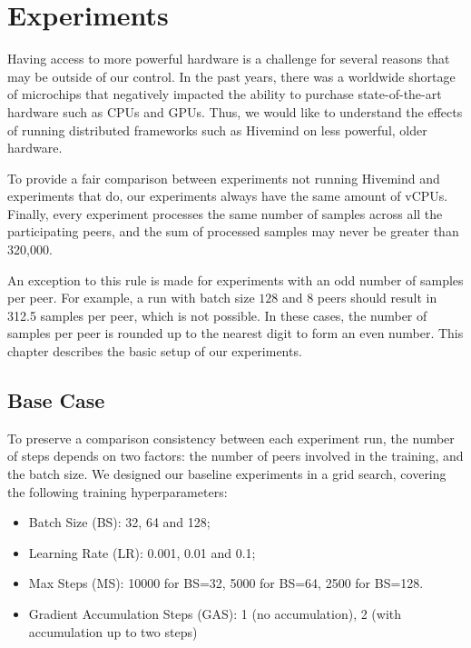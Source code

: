 \chapter{Experiments}\label{chapter:experiments}

Having access to more powerful hardware is a challenge for several reasons that may be outside of our control.
In the past years, there was a worldwide shortage of microchips that negatively impacted the ability to purchase state-of-the-art hardware such as CPUs and GPUs.
Thus, we would like to understand the effects of running distributed frameworks such as Hivemind on less powerful, older hardware.

To provide a fair comparison between experiments not running Hivemind and experiments that do, our experiments always have the same amount of vCPUs.
Finally, every experiment processes the same number of samples across all the participating peers, and the sum of processed samples may never be greater than 320,000.

An exception to this rule is made for experiments with an odd number of samples per peer.
For example, a run with batch size $128$ and 8 peers should result in 312.5 samples per peer, which is not possible.
In these cases, the number of samples per peer is rounded up to the nearest digit to form an even number.
This chapter describes the basic setup of our experiments.

\section{Base Case}

To preserve a comparison consistency between each experiment run, the number of steps depends on two factors: the number of peers involved in the training, and the batch size.
We designed our baseline experiments in a grid search, covering the following training hyperparameters:
\begin{itemize}
    \item Batch Size (BS): 32, 64 and 128;
    \item Learning Rate (LR): 0.001, 0.01 and 0.1;
    \item Max Steps (MS): 10000 for BS=32, 5000 for BS=64, 2500 for BS=128.
    \item Gradient Accumulation Steps (GAS): 1 (no accumulation), 2 (with accumulation up to two steps)
\end{itemize}

